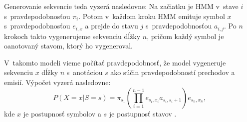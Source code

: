Generovanie sekvencie teda vyzerá nasledovne: Na začiatku je HMM v~stave $i$ s~pravdepodobnosťou $\pi_i$. Potom v~každom kroku HMM emituje symbol $x$ s~pravdepodobnosťou $e_{i, x}$ a prejde do stavu $j$ s~pravdepodobnosťou $a_{i,j}$. Po $n$ krokoch takto vygenerujeme sekvenciu dĺžky $n$, pričom každý symbol je oanotovaný stavom, ktorý ho vygeneroval.

V~takomto modeli vieme počítať pravdepodobnosť, že model vygeneruje sekvenciu $x$ dĺžky $n$ s~anotáciou $s$ ako súčin pravdepodobností prechodov a emisií.
Výpočet vyzerá nasledovne:
$$P(X=x | S=s) = \pi_{s_1}\left(\prod_{i=1}^{n-1} e_{s_i,x_i} a_{s_i,s_i+1}\right)e_{s_n,x_n},$$
kde $x$ je postupnosť symbolov a $s$ je postupnosť stavov \cite{skripta, durbin}.








